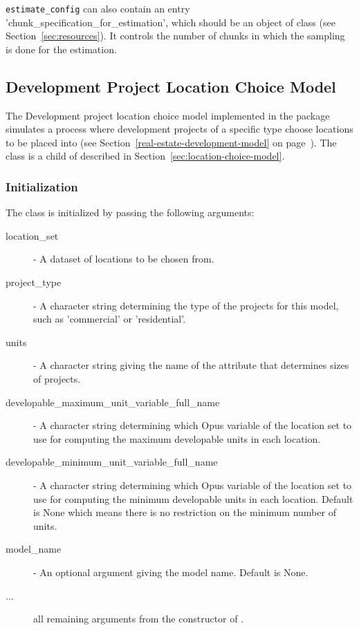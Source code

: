 \verb|estimate_config| can also contain an entry 'chunk_specification_for_estimation',
which should be an object of class  (see Section~\ref{sec:resources}).
It controls the number of chunks in which the sampling is done for the estimation.

%
%
\subsection{Development Project Location Choice Model}
%
\label{sec:development-project-lcm}
 
%
The Development project location choice model implemented in the
 package simulates a process where
development projects of a specific type choose locations to be placed into (see Section~\ref{real-estate-development-model}
on page~\pageref{real-estate-development-model-gridcell}).
The class  is a child of
  described in
Section~\ref{sec:location-choice-model}.

\subsubsection{Initialization}
%
The class is initialized by passing the following arguments:
\begin{description}
\item[location_set] - A dataset of locations to be chosen from.
\item[project_type] - A character string determining the type of the projects
  for this model, such as 'commercial' or 'residential'. 
\item[units] - A character string giving the name of the attribute that
  determines sizes of projects.
\item[developable_maximum_unit_variable_full_name] -  A character string determining
  which Opus variable of the location set to use for computing the maximum developable units
  in each location.
\item[developable_minimum_unit_variable_full_name] -  A character string determining
  which Opus variable of the location set to use for computing the minimum developable units
  in each location. Default is None which means there is no restriction on the minimum number of units.
\item[model_name] - An optional argument giving the model name. Default is None.
\item[...] all remaining arguments from the constructor of
  . 
\end{description}

